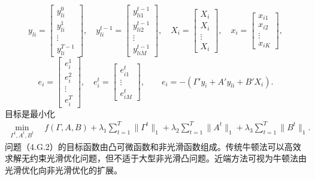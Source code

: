 \[
y_{li}=\begin{bmatrix}y_{li}^0\\y_{li}^1\\\vdots\\y_{li}^{T-1}\end{bmatrix},\quad
y_{li}^{t-1}=\begin{bmatrix}y_{li1}^{t-1}\\y_{li2}^{t-1}\\\vdots\\y_{liM}^{t-1}\end{bmatrix},\quad
X_i=\begin{bmatrix}X_i\\X_i\\\vdots\\X_i\end{bmatrix},\quad
x_i=\begin{bmatrix}x_{i1}\\x_{i2}\\\vdots\\x_{iK}\end{bmatrix},
\]
\[
e_i=\begin{bmatrix}e_i^1\\e_i^2\\\vdots\\e_i^T\end{bmatrix},\quad
e_i^t=\begin{bmatrix}e_{i1}^t\\\vdots\\e_{iM}^t\end{bmatrix},\qquad
e_i=-(\Gamma'y_i+A'y_{li}+B'X_i).
\]
目标是最小化
\begin{equation}
\begin{aligned}
\min_{\Gamma^t,A^t,B^t}\quad
f(\Gamma,A,B)+\lambda_1\sum_{t=1}^{T}\|\Gamma^t\|_1
+\lambda_2\sum_{t=1}^{T}\|A^t\|_1
+\lambda_3\sum_{t=1}^{T}\|B^t\|_1.
\end{aligned}\tag{4.G.2}
\end{equation}
问题（4.G.2）的目标函数由凸可微函数和非光滑函数组成。传统牛顿法可以高效求解无约束光滑优化问题，但不适于大型非光滑凸问题。近端方法可视为牛顿法由光滑优化向非光滑优化的扩展。


